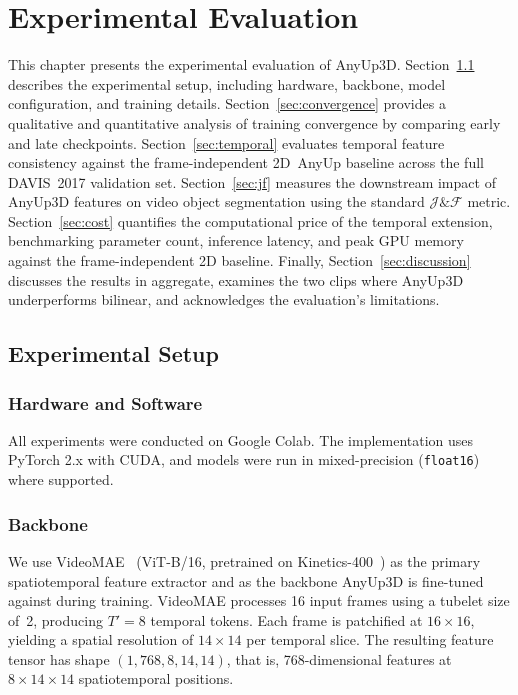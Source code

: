\chapter{Experimental Evaluation}
\label{ch:results}

This chapter presents the experimental evaluation of AnyUp3D.
Section~\ref{sec:setup} describes the experimental setup, including hardware, backbone, model configuration, and training details.
Section~\ref{sec:convergence} provides a qualitative and quantitative analysis of training convergence by comparing early and late checkpoints.
Section~\ref{sec:temporal} evaluates temporal feature consistency against the frame-independent 2D~AnyUp baseline across the full DAVIS~2017 validation set.
Section~\ref{sec:jf} measures the downstream impact of AnyUp3D features on video object segmentation using the standard $\mathcal{J}\&\mathcal{F}$ metric.
Section~\ref{sec:cost} quantifies the computational price of the temporal extension, benchmarking parameter count, inference latency, and peak GPU memory against the frame-independent 2D baseline.
Finally, Section~\ref{sec:discussion} discusses the results in aggregate, examines the two clips where AnyUp3D underperforms bilinear, and acknowledges the evaluation's limitations.


\section{Experimental Setup}
\label{sec:setup}

\subsection{Hardware and Software}

All experiments were conducted on Google Colab.
The implementation uses PyTorch 2.x with CUDA, and models were run in mixed-precision (\texttt{float16}) where supported.

\subsection{Backbone}

We use VideoMAE~\cite{videomae} (ViT-B/16, pretrained on Kinetics-400~\cite{kay2017kinetics}) as the primary spatiotemporal feature extractor and as the backbone AnyUp3D is fine-tuned against during training.
VideoMAE processes 16 input frames using a tubelet size of~2, producing $T' = 8$ temporal tokens.
Each frame is patchified at $16 \times 16$, yielding a spatial resolution of $14 \times 14$ per temporal slice.
The resulting feature tensor has shape $(1, 768, 8, 14, 14)$, that is, 768-dimensional features at $8 \times 14 \times 14$ spatiotemporal positions.

